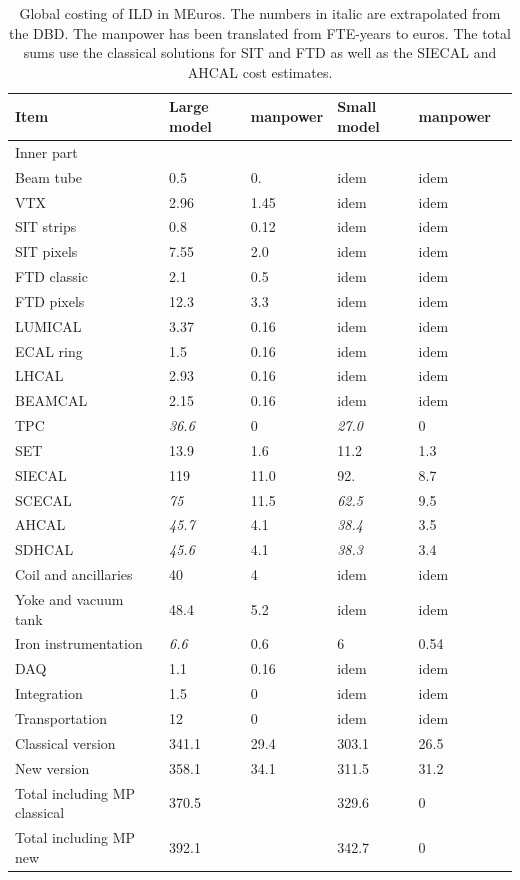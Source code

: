 \begin{table}[h!]\hspace*{-0cm}\small
\begin{tabular}{ l p{0.2\hsize}p{0.1\hsize}p{0.2\hsize} p{0.2\hsize}p{0.1\hsize}}
\toprule
\bf {Item}& \bf {Large model} & \bf manpower&  \bf {Small model}&\bf manpower \\
\midrule
Inner part&&&&\\
Beam tube & 0.5 &  0.& idem&idem \\
VTX        & 2.96  &1.45  &  idem &idem \\
SIT strips & 0.8   &0.12 & idem&idem\\
SIT pixels & 7.55  &2.0 & idem&idem\\
FTD classic & 2.1   &0.5  & idem &idem  \\
FTD pixels  & 12.3  &3.3  & idem &idem  \\
LUMICAL & 3.37  & 0.16& idem&idem\\
ECAL ring & 1.5 & 0.16 & idem&idem\\
LHCAL   & 2.93  & 0.16&idem& idem\\
BEAMCAL & 2.15  & 0.16& idem&idem\\
\midrule
TPC & \it36.6 & 0 & \it27.0 & 0\\
SET    & 13.9& 1.6&11.2&1.3\\
SIECAL & 119 & 11.0 & 92. & 8.7\\
SCECAL & \it75 & 11.5 & \it62.5 & 9.5\\
AHCAL  & \it45.7 & 4.1 & \it38.4 & 3.5\\
SDHCAL & \it45.6 & 4.1 & \it38.3 & 3.4\\
Coil and ancillaries &  40 & 4& idem & idem\\
Yoke and vacuum tank &  48.4 & 5.2& idem & idem \\
Iron instrumentation  &  \it6.6 & 0.6 & 6 & 0.54\\
DAQ       & 1.1 & 0.16& idem& idem\\
Integration & 1.5 & 0 &idem&idem\\
Transportation& 12 & 0 & idem & idem \\
\midrule
Classical version & 341.1   &  29.4  & 303.1 & 26.5  \\
New version & 358.1   &  34.1  & 311.5 & 31.2  \\
\midrule
Total including MP classical     & 370.5   &    & 329.6 & 0  \\
Total including MP new     & 392.1   &    & 342.7 & 0  \\
 \bottomrule
\end{tabular}
\caption{\label{cost_summary}Global costing of ILD in MEuros. The numbers in italic are extrapolated from the DBD. The manpower has been translated from FTE-years to euros. The total sums use the classical solutions for SIT and FTD as well as the SIECAL and AHCAL cost estimates. 
}
\end{table}

